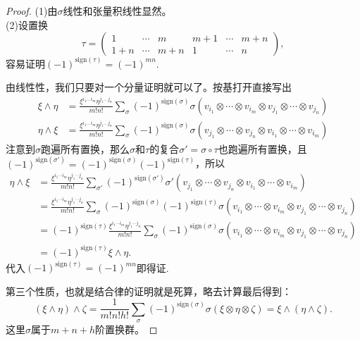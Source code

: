\documentclass[8pt]{book}
\theoremstyle{plain}%
\begin{document}
\begin{proof}
	(1)由$\sigma$线性和张量积线性显然。\\
	(2)设置换
	\[
		\tau=
		\begin{pmatrix}
			1& \cdots & m & m+1 &\cdots &m+n\\
			1+n& \cdots & m+n & 1 &\cdots &n
		\end{pmatrix},
	\]
	容易证明$(-1)^{\mathrm{sign}(\tau)}=(-1)^{mn}$.

	由线性性，我们只要对一个分量证明就可以了。按基打开直接写出
	\[
		\begin{split}
			\xi \wedge \eta&=\frac{\xi^{i_1\dots i_m}\eta^{j_1 \dots j_n}}{m!n!}\sum_{\sigma}(-1)^{\mathrm{sign}(\sigma)}\sigma(v_{i_1}\otimes \cdots \otimes v_{i_m}\otimes v_{j_1}\otimes \cdots \otimes v_{j_n})\\
			\eta \wedge \xi&=\frac{\xi^{i_1\dots i_m}\eta^{j_1 \dots j_n}}{m!n!}\sum_{\sigma}(-1)^{\mathrm{sign}(\sigma)}\sigma(v_{j_1}\otimes \cdots \otimes v_{j_n}\otimes v_{i_1}\otimes \cdots \otimes v_{i_m})
		\end{split}
	\]
	注意到$\sigma$跑遍所有置换，那么$\sigma$和$\tau$的复合$\sigma'=\sigma\circ\tau$也跑遍所有置换，且$(-1)^{\mathrm{sign}(\sigma')}=(-1)^{\mathrm{sign}(\sigma)}(-1)^{\mathrm{sign}(\tau)}$，所以
	\[
		\begin{split}
			\eta \wedge \xi&=\frac{\xi^{i_1\cdots i_m}\eta^{j_1 \cdots j_n}}{m!n!}\sum_{\sigma'}(-1)^{\mathrm{sign}(\sigma')}\sigma'(v_{j_1}\otimes \cdots \otimes v_{j_n}\otimes v_{i_1}\otimes \cdots \otimes v_{i_m})\\
			&=\frac{\xi^{i_1\cdots i_m}\eta^{j_1 \cdots j_n}}{m!n!}\sum_{\sigma}(-1)^{\mathrm{sign}(\sigma)}(-1)^{\mathrm{sign}(\tau)}\sigma(v_{i_1}\otimes \cdots \otimes v_{i_m}\otimes v_{j_1}\otimes \cdots \otimes v_{j_n})\\
			&=(-1)^{\mathrm{sign}(\tau)}\frac{\xi^{i_1\cdots i_m}\eta^{j_1 \cdots j_n}}{m!n!}\sum_{\sigma}(-1)^{\mathrm{sign}(\sigma)}\sigma(v_{i_1}\otimes \cdots \otimes v_{i_m}\otimes v_{j_1}\otimes \cdots \otimes v_{j_n})\\
			&=(-1)^{\mathrm{sign}(\tau)} \xi \wedge \eta.
		\end{split}
	\]
	代入$(-1)^{\mathrm{sign}(\tau)}=(-1)^{mn}$即得证.

	第三个性质，也就是结合律的证明就是死算，略去计算最后得到：
	\[
		(\xi \wedge \eta) \wedge \zeta=\frac{1}{m!n!h!}\sum_{\sigma}(-1)^{\mathrm{sign}(\sigma)}\sigma(\xi \otimes \eta \otimes \zeta)=\xi \wedge (\eta \wedge \zeta).
	\]
	这里$\sigma$属于$m+n+h$阶置换群。
\end{proof}
\end{document}
